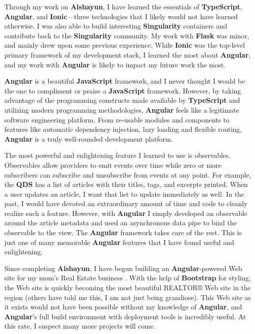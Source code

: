 \documentclass[12pt]{report}
\begin{document}
Through my work on \textbf{Alshayun}, I have learned the essentials of
\textbf{TypeScript}, \textbf{Angular}, and \textbf{Ionic}---three technologies
that I likely would not have learned otherwise. I was also able to build
interesting \textbf{Singularity} containers and contribute back to the
\textbf{Singularity} community. My work with \textbf{Flask} was minor, and
mainly drew upon some previous experience. While \textbf{Ionic} was the
top-level primary framework of my development stack, I learned the most about
\textbf{Angular}, and my work with \textbf{Angular} is likely to impact my
future work the most.

\textbf{Angular} is a beautiful \textbf{JavaScript} framework, and I never
thought I would be the one to compliment or praise a \textbf{JavaScript}
framework. However, by taking advantage of the programming constructs made
available by \textbf{TypeScript} and utilizing modern programming methodologies,
\textbf{Angular} feels like a legitimate software engineering platform. From
re-usable modules and components to features like automatic dependency
injection, lazy loading and flexible routing, \textbf{Angular} is a truly
well-rounded development platform.

The most powerful and enlightening feature I learned to use is observables.
Observables allow providers to emit events over time while zero or more
subscribers can subscribe and unsubscribe from events at any point. For example,
the \textbf{QDS} has a list of articles with their titles, tags, and excerpts
printed. When a user updates an article, I want that list to update immediately
as well. In the past, I would have devoted an extraordinary amount of time and
code to cleanly realize such a feature. However, with \textbf{Angular} I simply
developed an observable around the article metadata and used an asynchronous
data pipe to bind the observable to the view. The \textbf{Angular} framework
takes care of the rest. This is just one of many memorable \textbf{Angular}
features that I have found useful and enlightening.

Since completing \textbf{Alshayun}, I have begun building an
\textbf{Angular}-powered Web site for my mom's Real Estate business \cite{knr}.
With the help of \textbf{Bootstrap} for styling, the Web site is quickly
becoming the most beautiful REALTOR® Web site in the region (others have told me
this, I am not just being grandiose). This Web site as it exists would not have
been possible without my knowledge of \textbf{Angular}, and \textbf{Angular}'s
full build environment with deployment tools is incredibly useful.  At this
rate, I suspect many more projects will come.
\end{document}
